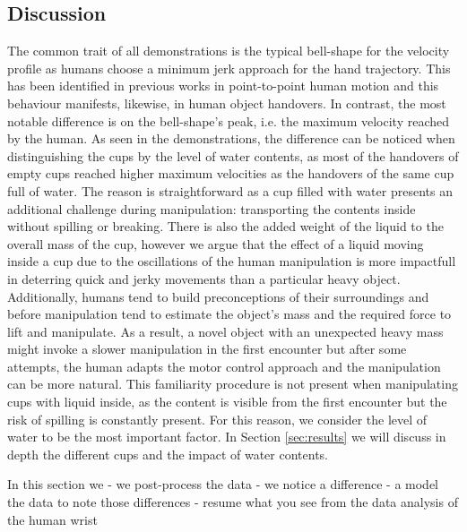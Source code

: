 \subsection{Discussion}

The common trait of all demonstrations is the typical bell-shape for the velocity profile as humans choose a minimum jerk approach for the hand trajectory. This has been identified in previous works in point-to-point human motion \cite{flash} and this behaviour manifests, likewise, in human object handovers. In contrast, the most notable difference is on the bell-shape's peak, i.e. the maximum velocity reached by the human. As seen in the demonstrations, the difference can be noticed when distinguishing the cups by the level of water contents, as most of the handovers of empty cups reached higher maximum velocities as the handovers of the same cup full of water. The reason is straightforward as a cup filled with water presents an additional challenge during manipulation: transporting the contents inside without spilling or breaking. There is also the added weight of the liquid to the overall mass of the cup, however we argue that the effect of a liquid moving inside a cup due to the oscillations of the human manipulation is more impactfull in deterring quick and jerky movements than a particular heavy object. Additionally, humans tend to build preconceptions of their surroundings and before manipulation tend to estimate the object's mass and the required force to lift and manipulate. As a result, a novel object with an unexpected heavy mass might invoke a slower manipulation in the first encounter but after some attempts, the human adapts the motor control approach and the manipulation can be more natural. This familiarity procedure is not present when manipulating cups with liquid inside, as the content is visible from the first encounter but the risk of spilling is constantly present. For this reason, we consider the level of water to be the most important factor. In Section \ref{sec:results} we will discuss in depth the different cups and the impact of water contents. 

In this section we 
- we post-process the data
- we notice a difference
- a model the data to note those differences
- resume what you see from the data analysis of the human wrist


